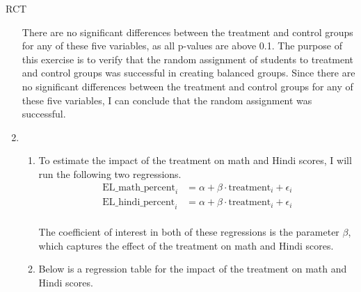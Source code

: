 \begin{homeworkProblem}{RCT}
\begin{solution}
\begin{enumerate}
                \pagebreak

                There are no significant differences between the treatment and
                control groups for any of these five variables, as all p-values
                are above 0.1. The purpose of this exercise is to verify that
                the random assignment of students to treatment and control groups
                was successful in creating balanced groups. Since there are no
                significant differences between the treatment and control groups
                for any of these five variables, I can conclude that the random
                assignment was successful.

            \item \begin{enumerate}
                \item To estimate the impact of the treatment on math and
                    Hindi scores, I will run the following two regressions.
                    \[
                        \begin{split}
                            \text{EL\_math\_percent}_i &= \alpha + \beta \cdot \text{treatment}_i + \epsilon_i \\
                            \text{EL\_hindi\_percent}_i &= \alpha + \beta \cdot \text{treatment}_i + \epsilon_i \\
                        \end{split}
                    \]

                    The coefficient of interest in both of these regressions 
                    is the parameter $\beta$, which captures the effect of the 
                    treatment on math and Hindi scores.
                \item Below is a regression table for the impact of the
                    treatment on math and Hindi scores.
                    

\end{enumerate}
\end{enumerate}
\end{solution}
\end{homeworkProblem}
